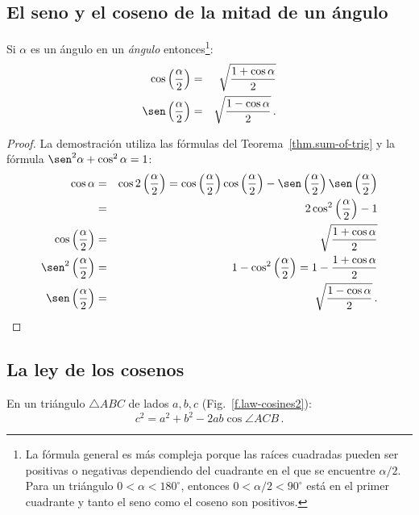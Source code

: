 \subsection{El seno y el coseno de la mitad de un ángulo}\label{s.sine-cosine-half}
\begin{theorem}\label{thm.sine-cosine-half}
Si $\alpha$ es un ángulo en un \emph{ángulo} entonces\footnote{La fórmula general es más compleja porque las raíces cuadradas pueden ser positivas o negativas dependiendo del cuadrante en el que se encuentre $\alpha/2$. Para un triángulo $0\!<\!\alpha\!<\!180^\circ$, entonces $0\!<\!\alpha/2\!<\!90^\circ$ está en el primer cuadrante y tanto el seno como el coseno son positivos.}:
\begin{eqnarray*}
\cos \left(\frac{\alpha}{2}\right)&=&\sqrt{\frac{1+\cos\alpha}{2}}\\
\sen\left(\frac{\alpha}{2}\right)&=&\sqrt{\frac{1-\cos\alpha}{2}}\,.
\end{eqnarray*}
\end{theorem}

\begin{proof}
La demostración utiliza las fórmulas del Teorema~\ref{thm.sum-of-trig} y la fórmula $\sen^2\alpha+\cos^2\alpha=1$:
\begin{eqnarray*}
\cos \alpha&=&\cos 2\left(\frac{\alpha}{2}\right)=\cos \left(\frac{\alpha}{2}\right)\cos\left(\frac{\alpha}{2}\right)-\sen \left(\frac{\alpha}{2}\right)\sen\left(\frac{\alpha}{2}\right)\\
&=&2\cos^2 \left(\frac{\alpha}{2}\right)-1\\
\cos \left(\frac{\alpha}{2}\right)&=&\sqrt{\frac{1+\cos\alpha}{2}}\\
\sen^2\left(\frac{\alpha}{2}\right)&=& 1-\cos^2\left(\frac{\alpha}{2}\right)=1-\frac{1+\cos\alpha}{2}\\
\sen \left(\frac{\alpha}{2}\right)&=&\sqrt{\frac{1-\cos\alpha}{2}}\,.
\end{eqnarray*}
\end{proof}


\subsection{La ley de los cosenos}

\begin{theorem}
En un triángulo $\triangle ABC$ de lados $a,b,c$ (Fig.~\ref{f.law-cosines2}):\label{thm.law-of-cosines}
\[
c^2=a^2+b^2-2ab\cos \angle ACB\,.
\]
\end{theorem}

